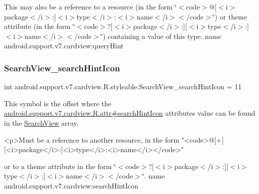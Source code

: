 This may also be a reference to a resource (in the form \char`\"{}$<$code$>$@\mbox{[}$<$i$>$package$<$/i$>$\+:\mbox{]}$<$i$>$type$<$/i$>$\+:$<$i$>$name$<$/i$>$$<$/code$>$\char`\"{}) or theme attribute (in the form \char`\"{}$<$code$>$?\mbox{[}$<$i$>$package$<$/i$>$\+:\mbox{]}\mbox{[}$<$i$>$type$<$/i$>$\+:\mbox{]}$<$i$>$name$<$/i$>$$<$/code$>$\char`\"{}) containing a value of this type.  name android.\+support.\+v7.\+cardview\+:query\+Hint \mbox{\label{classandroid_1_1support_1_1v7_1_1cardview_1_1R_1_1styleable_a6f8fc657ddfa535ada1e5e37d0a4c369}} 
\subsubsection{\texorpdfstring{Search\+View\+\_\+search\+Hint\+Icon}{SearchView\_searchHintIcon}}
{\footnotesize\ttfamily int android.\+support.\+v7.\+cardview.\+R.\+styleable.\+Search\+View\+\_\+search\+Hint\+Icon = 11\hspace{0.3cm}{\ttfamily [static]}}

This symbol is the offset where the \hyperlink{classandroid_1_1support_1_1v7_1_1cardview_1_1R_1_1attr_abd1a6922795d8eb2f926d5ce77d1e192}{android.\+support.\+v7.\+cardview.\+R.\+attr\#search\+Hint\+Icon} attribute\textquotesingle{}s value can be found in the \hyperlink{classandroid_1_1support_1_1v7_1_1cardview_1_1R_1_1styleable_a6a300ecad88f70a7642265f73ff4d33f}{Search\+View} array.

\begin{DoxyVerb}      <p>Must be a reference to another resource, in the form "<code>@[+][<i>package</i>:]<i>type</i>:<i>name</i></code>"
\end{DoxyVerb}
 or to a theme attribute in the form \char`\"{}$<$code$>$?\mbox{[}$<$i$>$package$<$/i$>$\+:\mbox{]}\mbox{[}$<$i$>$type$<$/i$>$\+:\mbox{]}$<$i$>$name$<$/i$>$$<$/code$>$\char`\"{}.  name android.\+support.\+v7.\+cardview\+:search\+Hint\+Icon \mbox{\label{classandroid_1_1support_1_1v7_1_1cardview_1_1R_1_1styleable_a1e912bff6dbc1cd9b21249197e9e3d89}} 
